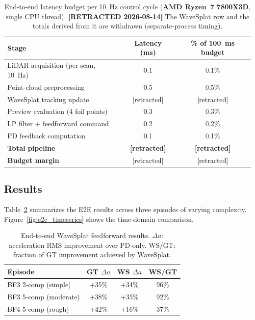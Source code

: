 \documentclass[review]{elsarticle}
\begin{document}
\begin{table}[t]
\centering
\caption{End-to-end latency budget per 10~Hz control cycle
(\textbf{AMD Ryzen~7 7800X3D}, single CPU thread).
\textbf{[RETRACTED 2026-08-14]} The WaveSplat row and the totals derived from
it are withdrawn (separate-process timing).}
\label{tab:latency}
\begin{tabular}{lcc}
\toprule
Stage & Latency (ms) & \% of 100~ms budget \\
\midrule
LiDAR acquisition (per scan, 10~Hz) & 0.1 & 0.1\% \\
Point-cloud preprocessing            & 0.5 & 0.5\% \\
WaveSplat tracking update            & [retracted] & [retracted] \\
Preview evaluation (4 foil points)   & 0.3 & 0.3\% \\
LP filter + feedforward command      & 0.2 & 0.2\% \\
PD feedback computation              & 0.1 & 0.1\% \\
\midrule
\textbf{Total pipeline}              & \textbf{[retracted]} & \textbf{[retracted]} \\
\textbf{Budget margin}               & [retracted] & [retracted] \\
\bottomrule
\end{tabular}
\end{table}

\subsection{Results}

Table~\ref{tab:e2e} summarizes the E2E results across three
episodes of varying complexity.
Figure~\ref{fig:e2e_timeseries} shows the time-domain comparison.

\begin{table}[t]
\centering
\caption{End-to-end WaveSplat feedforward results.
$\Delta a$: acceleration RMS improvement over PD-only.
WS/GT: fraction of GT improvement achieved by WaveSplat.}
\label{tab:e2e}
\begin{tabular}{lccc}
\toprule
Episode & GT $\Delta a$ & WS $\Delta a$ & WS/GT \\
\midrule
BF3 2-comp (simple)   & +35\% & +34\% & 96\% \\
BF3 5-comp (moderate) & +38\% & +35\% & 92\% \\
BF4 5-comp (rough)    & +42\% & +16\% & 37\% \\
\bottomrule
\end{tabular}
\end{table}
\end{document}
